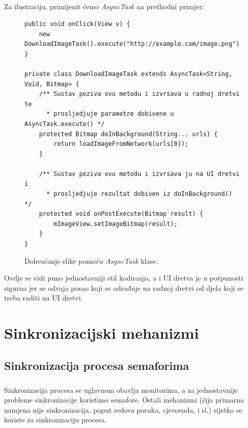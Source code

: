\documentclass[times, utf8, zavrsni]{fer}
\begin{document}
\paragraph{}
Za ilustraciju, primijenit ćemo \textit{AsyncTask} na prethodni primjer:

\begin{figure}[ht!]
\begin{lstlisting}
public void onClick(View v) {
    new DownloadImageTask().execute("http://example.com/image.png");
}

private class DownloadImageTask extends AsyncTask<String, Void, Bitmap> {
    /** Sustav poziva ovu metodu i izvrsava u radnoj dretvi te
      * prosljedjuje parametre dobivene u AsyncTask.execute() */
    protected Bitmap doInBackground(String... urls) {
        return loadImageFromNetwork(urls[0]);
    }

    /** Sustav poziva ovu metodu i izvrsava ju na UI dretvi i
      * prosljedjuje rezultat dobiven iz doInBackground() */
    protected void onPostExecute(Bitmap result) {
        mImageView.setImageBitmap(result);
    }
}
\end{lstlisting}
\caption{Dohvaćanje slike pomoću \textit{AsyncTask} klase.}
\label{overflow}
\end{figure}

Ovdje se vidi puno jednostavniji stil kodiranja, a i UI dretva je u potpunosti sigurna jer se odvaja posao koji se odrađuje na radnoj dretvi od djela koji se treba raditi na UI dretvi.\newpage

\chapter{Sinkronizacijski mehanizmi}
\section{Sinkronizacija procesa semaforima}
\paragraph{}
Sinkronizacija procesa se uglavnom obavlja monitorima, a za jednostavnije probleme sinkronizacije koristimo semafore. Ostali mehanizmi (čija primarna namjena nije sinkronizacija, poput redova poruka, cjevovoda, i sl.) rijetko se koriste za sinkronizaciju procesa.\\
\end{document}
